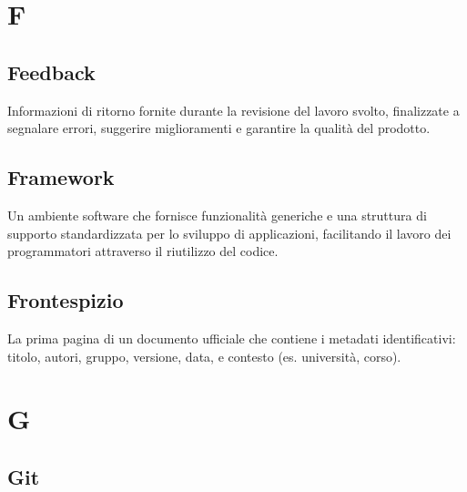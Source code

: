 \documentclass[a4paper, 11pt, oneside]{scrartcl} %
\begin{document}

\section*{F}


\subsection*{Feedback}


Informazioni di ritorno fornite durante la revisione del lavoro svolto, finalizzate a segnalare errori, suggerire miglioramenti e garantire la qualità del prodotto.

\vspace{0.5cm}

\subsection*{Framework}
Un ambiente software che fornisce funzionalità generiche e una struttura di supporto standardizzata per lo sviluppo di applicazioni, facilitando il lavoro dei programmatori attraverso il riutilizzo del codice.
\vspace{0.5cm}

\subsection*{Frontespizio}


La prima pagina di un documento ufficiale che contiene i metadati identificativi: titolo, autori, gruppo, versione, data, e contesto (es. università, corso).

\vspace{0.5cm}


\section*{G}


\subsection*{Git}
\end{document}
